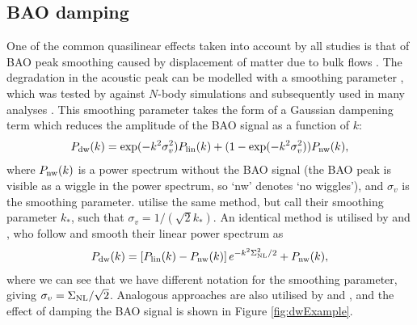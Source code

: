 \documentclass[titlesmallcaps, examinerscopy, copyrightpage]{uqthesis}
\begin{document}
\subsection{BAO damping}

One of the common quasilinear effects taken into account by all studies is that of BAO peak smoothing caused by displacement of matter due to bulk flows \citep{EisensteinSeoWhite2007,CrocceScoccimarro2008,Matsubara2008,CrocceScoccimarro2006}. The degradation in the acoustic peak can be modelled with a smoothing parameter \citep{CrocceScoccimarro2008}, which was tested by \citet{SanchezBaughAngulo2008} against $N$-body simulations and subsequently used in many analyses \citep{BlakeDavis2011,EisensteinZehavi2005,Sanchez2009,BeutlerBlake2011}. This smoothing parameter takes the form of a Gaussian dampening term which reduces the amplitude of the BAO signal as a function of $k$:
\begin{align} \label{{eq:blake1}}
P_{\rm{dw}}(k) = \exp(-k^2 \sigma_v^2) P_{\rm{lin}}(k) + (1 - \exp(-k^2 \sigma_v^2)) P_{\rm{nw}}(k),
\end{align}
where $P_{\rm{nw}}(k)$ is a power spectrum without the BAO signal (the BAO peak is visible as a wiggle in the power spectrum, so `nw' denotes `no wiggles'), and $\sigma_v$ is the smoothing parameter. \citet{ChuangWang2012} utilise the same method, but call their smoothing parameter $k_*$, such that $\sigma_v = 1/(\sqrt{2} k_*)$. An identical method is utilised by \citep{AndersonAubourg2012} and \citet{XuPadmanabhan2012}, who follow \citet{EisensteinSeoWhite2007} and smooth their linear power spectrum as
\begin{align}
P_{\rm{dw}}(k) = \left[ P_{\rm{lin}}(k) - P_{\rm{nw}}(k) \right] e^{-k^2 \Sigma_{\rm{NL}}^2 / 2} + P_{\rm{nw}}(k),
\end{align}
where we can see that we have different notation for the smoothing parameter, giving $\sigma_v = \Sigma_{\rm{NL}} / \sqrt{2}$. Analogous approaches are also utilised by \citet{MontesanoSanchezPhelps2012} and \citet{SanchezScoccola2012}, and the effect of damping the BAO signal is shown in Figure \ref{fig:dwExample}.
\end{document}
